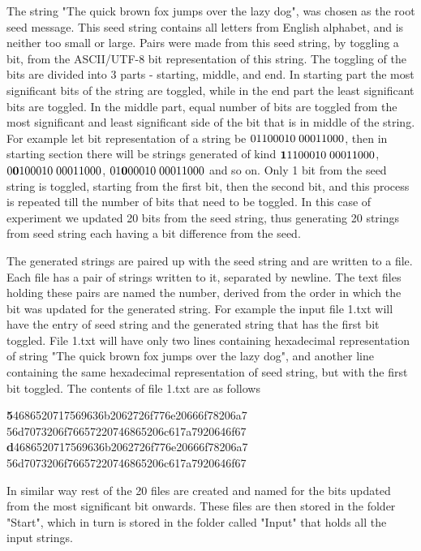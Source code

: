 The string "The quick brown fox jumps over the lazy dog", was chosen as the root seed message. This seed string
contains all letters from English alphabet, and is neither too small or large. Pairs were made from this seed
string, by toggling a bit, from the ASCII/UTF-8 bit representation of this string. The toggling of the bits are
divided into 3 parts - starting, middle, and end. In starting part the most significant bits of the string are
toggled, while in the end part the least significant bits are toggled. In the middle part, equal number of bits 
are toggled from the most significant and least significant side of the bit that is in middle of the string. For
example let bit representation of a string be $01100010\thickspace00011000$, then in starting section there 
will be strings generated of kind ${\bf 1}1100010\thickspace00011000$, $0{\bf 0}100010\thickspace00011000$,
$01{\bf 0}00010\thickspace00011000$ and so on. Only 1 bit from the seed string is toggled, starting from the
first bit, then the second bit, and this process is repeated till the number of bits that need to be toggled. 
In this case of experiment we updated 20 bits from the seed string, thus generating 20 strings from seed string 
each having a bit difference from the seed.

The generated strings are paired up with the seed string and are written to a file. Each file has a pair of
strings written to it, separated by newline. The text files holding these pairs are named the number, derived
from the order in which the bit was updated for the generated string. For example the input file 1.txt will
have the entry of seed string and the generated string that has the first bit toggled. File 1.txt will have 
only two lines containing hexadecimal representation of string "The quick brown fox jumps over the lazy dog",
and another line containing the same hexadecimal representation of seed string, but with the first bit toggled.
The contents of file 1.txt are as follows 

\newpage
\begin{center}{\bf 5}4686520717569636b2062726f776e20666f78206a7 \\
56d7073206f76657220746865206c617a7920646f67 \\ 
\vspace{2mm}
{\bf d}4686520717569636b2062726f776e20666f78206a7 \\
56d7073206f76657220746865206c617a7920646f67\end{center}

In similar way rest of the 20 files are created and named for the bits updated from the most significant 
bit onwards. These files are then stored in the folder "Start", which in turn is stored in the folder 
called "Input" that holds all the input strings.

